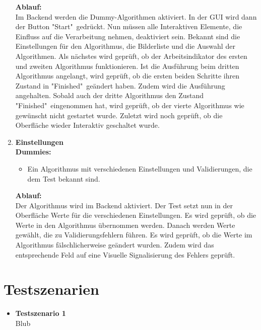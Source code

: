 \begin{enumerate}[align=left, leftmargin=4em, label={\textbf{\textbackslash T3.\arabic*0\textbackslash}} ]
\begin{itemize}
	\end{itemize}
	\subitem \textbf{Ablauf:}\\ Im Backend werden die Dummy-Algorithmen aktiviert. In der GUI wird dann der Button "{}Start" gedrückt. Nun müssen alle Interaktiven Elemente, die Einfluss auf die Verarbeitung nehmen, deaktiviert sein. Bekannt sind die Einstellungen für den Algorithmus, die Bilderliste und die Auswahl der Algorithmen. Als nächstes wird geprüft, ob der Arbeitsindikator des ersten und zweiten Algorithmus funktionieren. Ist die Ausführung beim dritten Algorithmus angelangt, wird geprüft, ob die ersten beiden Schritte ihren Zustand in "{}Finished" geändert haben. Zudem wird die Ausführung angehalten. Sobald auch der dritte Algorithmus den Zustand "{}Finished" eingenommen hat, wird geprüft, ob der vierte Algorithmus wie gewünscht nicht gestartet wurde. Zuletzt wird noch geprüft, ob die Oberfläche wieder Interaktiv geschaltet wurde.
	\item \textbf{Einstellungen}\\
	\subitem \textbf{Dummies:}\begin{itemize}
		\item Ein Algorithmus mit verschiedenen Einstellungen und Validierungen, die dem Test bekannt sind.
	\end{itemize}
	\subitem \textbf{Ablauf:}\\ Der Algorithmus wird im Backend aktiviert. Der Test setzt nun in der Oberfläche Werte für die verschiedenen Einstellungen. Es wird geprüft, ob die Werte in den Algorithmus übernommen werden. Danach werden Werte gewählt, die zu Validierungsfehlern führen. Es wird geprüft, ob die Werte im Algorithmus fälschlicherweise geändert wurden. Zudem wird das entsprechende Feld auf eine Visuelle Signalisierung des Fehlers geprüft.
\end{enumerate}
\section{Testszenarien}
	\begin{itemize}
		\item \textbf{Testszenario 1}\\
		Blub
	\end{itemize}